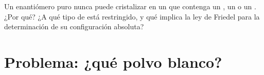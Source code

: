 \begin{exercise}[$\star\star\star$]\label{exo:b3:x-ray-diffraction:12}
Un enantiómero puro nunca puede cristalizar en un  que contenga un
, un  o un . ¿Por qué? ¿A qué tipo de 
está restringido, y qué implica la ley de Friedel para la determinación de su configuración
absoluta?
\end{exercise}

\clearpage
\enlargethispage{3\baselineskip}
\section{Problema: ¿qué polvo blanco?}

